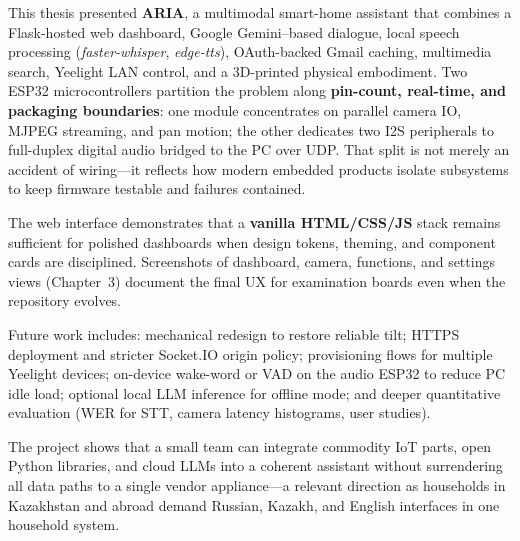 \documentclass[12pt,a4paper]{report}
\begin{document}
This thesis presented \textbf{ARIA}, a multimodal smart-home assistant that combines a Flask-hosted web dashboard, Google Gemini--based dialogue, local speech processing (\textit{faster-whisper}, \textit{edge-tts}), OAuth-backed Gmail caching, multimedia search, Yeelight LAN control, and a 3D-printed physical embodiment. Two ESP32 microcontrollers partition the problem along \textbf{pin-count, real-time, and packaging boundaries}: one module concentrates on parallel camera IO, MJPEG streaming, and pan motion; the other dedicates two I2S peripherals to full-duplex digital audio bridged to the PC over UDP. That split is not merely an accident of wiring---it reflects how modern embedded products isolate subsystems to keep firmware testable and failures contained.

The web interface demonstrates that a \textbf{vanilla HTML/CSS/JS} stack remains sufficient for polished dashboards when design tokens, theming, and component cards are disciplined. Screenshots of dashboard, camera, functions, and settings views (Chapter~3) document the final UX for examination boards even when the repository evolves.

Future work includes: mechanical redesign to restore reliable tilt; HTTPS deployment and stricter Socket.IO origin policy; provisioning flows for multiple Yeelight devices; on-device wake-word or VAD on the audio ESP32 to reduce PC idle load; optional local LLM inference for offline mode; and deeper quantitative evaluation (WER for STT, camera latency histograms, user studies).

The project shows that a small team can integrate commodity IoT parts, open Python libraries, and cloud LLMs into a coherent assistant without surrendering all data paths to a single vendor appliance---a relevant direction as households in Kazakhstan and abroad demand Russian, Kazakh, and English interfaces in one household system.
\end{document}
